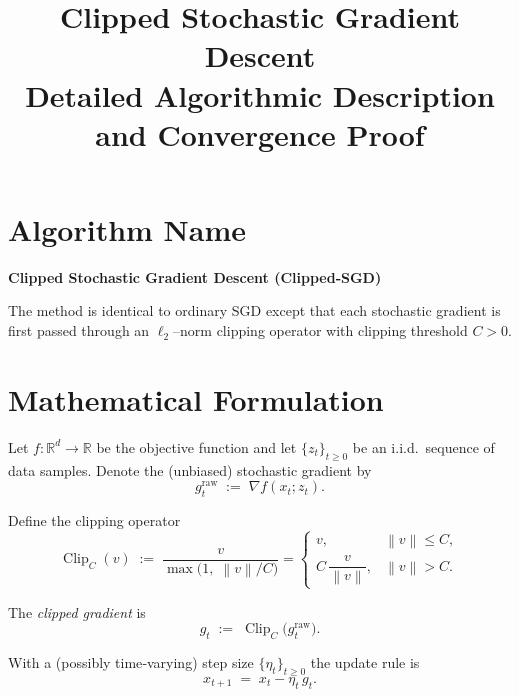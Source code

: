 \documentclass{article}
\newcommand{\R}{\mathbb{R}}
\newcommand{\norm}[1]{\left\lVert#1\right\rVert}
\begin{document}
\title{Clipped Stochastic Gradient Descent \\ Detailed Algorithmic Description and Convergence Proof}
\author{}
\date{}
\maketitle

\section*{Algorithm Name}
\textbf{Clipped Stochastic Gradient Descent (Clipped‑SGD)}  

The method is identical to ordinary SGD except that each stochastic gradient is
first passed through an $\ell_2$–norm clipping operator with clipping threshold
$C>0$.

\section*{Mathematical Formulation}
Let $f:\R^{d}\to\R$ be the objective function and let $\{z_t\}_{t\ge 0}$ be an
i.i.d.\ sequence of data samples.  
Denote the (unbiased) stochastic gradient by
\[
g^{\text{raw}}_t \;:=\; \nabla f(x_t;z_t).
\]

Define the clipping operator
\[
\operatorname{Clip}_C(v)\;:=\;
\frac{v}{\max\!\bigl(1,\;\norm{v}/C\bigr)}
=
\begin{cases}
v, & \norm{v}\le C,\\[4pt]
C\,\dfrac{v}{\norm{v}}, & \norm{v}>C .
\end{cases}
\tag{1}
\]

The \emph{clipped gradient} is
\[
g_t \;:=\; \operatorname{Clip}_C\!\bigl(g^{\text{raw}}_t\bigr).\tag{2}
\]

With a (possibly time‑varying) step size $\{\eta_t\}_{t\ge0}$ the update rule is
\[
x_{t+1}\;=\;x_t - \eta_t\, g_t .\tag{3}
\]

\end{document}
